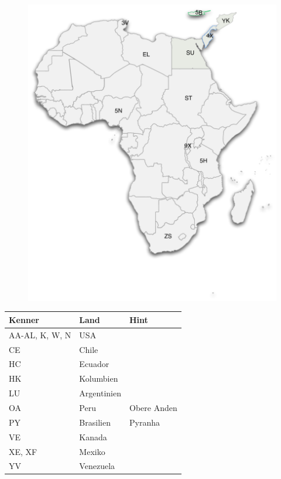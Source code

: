 \documentclass[11pt,BCOR=8.5mm]{scrartcl}
\begin{document}
\begin{figure}[htbp]
  \begin{center}
	\includegraphics[width=14cm]{figures/landeskenner-afrika}
	\label{fig:landeskenner-afrika}
  \end{center}
\end{figure}

\begin{longtable}{| l | l | l |}
  \hline
  Kenner & Land & Hint \\
  \hline
  \hline
  \endhead
  \hline
  AA-AL, K, W, N & USA & \\
  \hline
  CE & Chile & \\
  \hline
  HC & Ecuador & \\
  \hline
  HK & Kolumbien & \\
  \hline
  LU & Argentinien & \\
  \hline
  OA & Peru & Obere Anden\\
  \hline
  PY & Brasilien & Pyranha\\
  \hline
  VE & Kanada & \\
  \hline
  XE, XF & Mexiko & \\
  \hline
  YV & Venezuela & \\
  \hline
\end{longtable}
\end{document}
